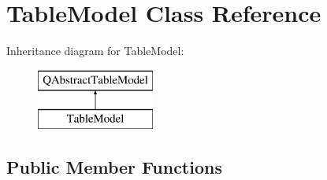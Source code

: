 \hypertarget{class_table_model}{}\section{Table\+Model Class Reference}
\label{class_table_model}
Inheritance diagram for Table\+Model\+:\begin{figure}[H]
\begin{center}
\leavevmode
\includegraphics[height=2.000000cm]{class_table_model}
\end{center}
\end{figure}
\subsection*{Public Member Functions}
